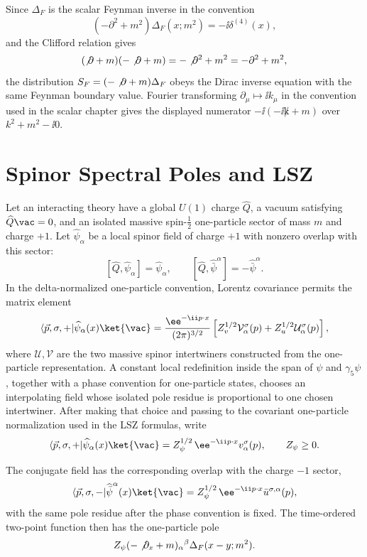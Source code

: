 Since \(\Delta_F\) is the scalar Feynman inverse in the convention
\[
  (-\partial^2+m^2)\Delta_F(x;m^2)=-\ii\delta^{(4)}(x),
\]
and the Clifford relation gives
\[
  (\not\partial+m)(-\not\partial+m)
  =
  -\not\partial^2+m^2
  =
  -\partial^2+m^2,
\]
the distribution \(S_F=(-\not\partial+m)\Delta_F\) obeys the Dirac inverse
equation with the same Feynman boundary value.  Fourier transforming
\(\partial_\mu\mapsto\ii k_\mu\) in the convention used in the scalar
chapter gives the displayed numerator
\(-\ii(-\ii\not k+m)\) over \(k^2+m^2-\ii0\).

\section{Spinor Spectral Poles and LSZ}

\begin{definition}
\label{def:isolated-spinor-one-particle-pole-datum}
Let an interacting theory have a global \(U(1)\) charge \(\widehat Q\), a
vacuum satisfying \(\widehat Q\vac=0\), and an isolated massive
spin-\(\frac12\) one-particle sector of mass \(m\) and charge \(+1\). Let
\(\widehat\psi_\alpha\) be a local spinor field of charge \(+1\) with nonzero
overlap with this sector:
\[
  [\widehat Q,\widehat\psi_\alpha]=\widehat\psi_\alpha,
  \qquad
  [\widehat Q,\widehat{\bar\psi}^{\alpha}]
  =
  -\widehat{\bar\psi}^{\alpha}.
\]
In the delta-normalized one-particle convention, Lorentz covariance permits
the matrix element
\[
  \langle\vec p,\sigma,+|\widehat\psi_\alpha(x)\ket{\vac}
  =
  \frac{\ee^{-\ii p\cdot x}}{(2\pi)^{3/2}}
  \left[
    Z_v^{1/2}\mathcal V_\alpha^\sigma(p)
    +
    Z_u^{1/2}\mathcal U_\alpha^\sigma(p)
  \right],
\]
where \(\mathcal U,\mathcal V\) are the two massive spinor intertwiners
constructed from the one-particle representation. A constant local
redefinition inside the span of \(\psi\) and \(\gamma_5\psi\), together with a
phase convention for one-particle states, chooses an interpolating field whose
isolated pole residue is proportional to one chosen intertwiner. After making
that choice and passing to the covariant one-particle normalization used in
the LSZ formulas, write
\[
  \langle\vec p,\sigma,+|\widehat\psi_\alpha(x)\ket{\vac}
  =
  Z_\psi^{1/2}\,
  \ee^{-\ii p\cdot x}v_\alpha^\sigma(p),
  \qquad
  Z_\psi\ge0 .
\]
\end{definition}

\begin{proposition}
\label{prop:locality-fixes-conjugate-spinor-pole-residue}
The conjugate field has the corresponding overlap with the charge \(-1\)
sector,
\[
  \langle\vec p,\sigma,-|
  \widehat{\bar\psi}^{\alpha}(x)\ket{\vac}
  =
  Z_\psi^{1/2}\,
  \ee^{-\ii p\cdot x}\bar u^{\sigma,\alpha}(p),
\]
with the same pole residue after the phase convention is fixed.  The
time-ordered two-point function then has the one-particle pole
\[
  Z_\psi
  (-\not\partial_x+m)_\alpha{}^\beta
  \Delta_F(x-y;m^2).
\]
\end{proposition}

